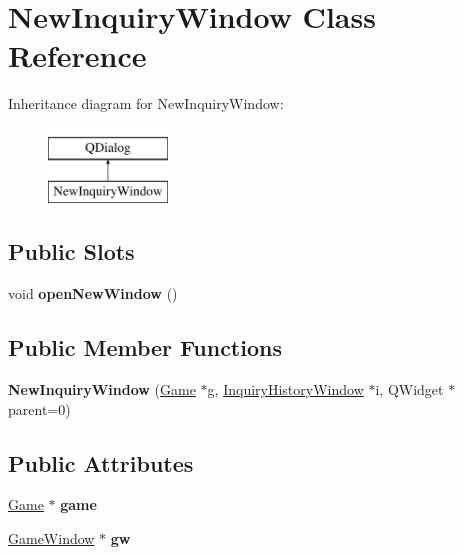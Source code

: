 \hypertarget{classNewInquiryWindow}{}\section{New\+Inquiry\+Window Class Reference}
\label{classNewInquiryWindow}
Inheritance diagram for New\+Inquiry\+Window\+:\begin{figure}[H]
\begin{center}
\leavevmode
\includegraphics[height=2.000000cm]{classNewInquiryWindow}
\end{center}
\end{figure}
\subsection*{Public Slots}
\begin{DoxyCompactItemize}
\item 
\mbox{\label{classNewInquiryWindow_aa8d01ffe4f4dc704505785f507652bd2}} 
void {\bfseries open\+New\+Window} ()
\end{DoxyCompactItemize}
\subsection*{Public Member Functions}
\begin{DoxyCompactItemize}
\item 
\mbox{\label{classNewInquiryWindow_a1fb15d4ea79c5b3c8c81b2e523eeffa8}} 
{\bfseries New\+Inquiry\+Window} (\hyperlink{classGame}{Game} $\ast$g, \hyperlink{classInquiryHistoryWindow}{Inquiry\+History\+Window} $\ast$i, Q\+Widget $\ast$parent=0)
\end{DoxyCompactItemize}
\subsection*{Public Attributes}
\begin{DoxyCompactItemize}
\item 
\mbox{\label{classNewInquiryWindow_a76c564bfdd2a2950d4190e0d7b55091e}} 
\hyperlink{classGame}{Game} $\ast$ {\bfseries game}
\item 
\mbox{\label{classNewInquiryWindow_a78a6436a76286c46819f4c3c4b42b2be}} 
\hyperlink{classGameWindow}{Game\+Window} $\ast$ {\bfseries gw}
\end{DoxyCompactItemize}
